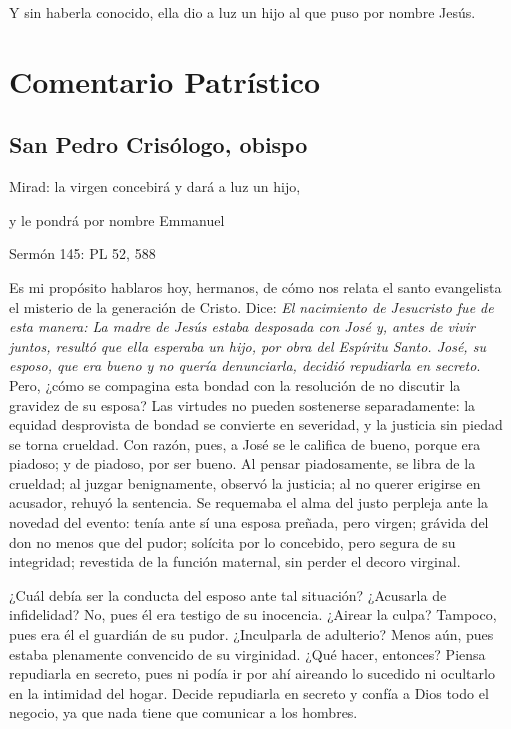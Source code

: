 \begin{body}
\begin{body}
Y sin haberla conocido, ella dio a luz un hijo al que puso por nombre
Jesús.



\section{Comentario Patrístico}

\subsection{San Pedro Crisólogo, obispo}

Mirad: la virgen concebirá y dará a luz un hijo,

y le pondrá por nombre Emmanuel

Sermón 145: PL 52, 588

Es mi propósito hablaros hoy, hermanos, de cómo nos relata el santo evangelista el misterio de la generación de Cristo. Dice: \emph{El nacimiento de Jesucristo fue de esta manera: La madre de Jesús estaba desposada con José y, antes de vivir juntos, resultó que ella esperaba un hijo, por obra del Espíritu Santo. José, su esposo, que era bueno y no quería denunciarla, decidió repudiarla en secreto}. Pero, ¿cómo se compagina esta bondad con la resolución de no discutir la gravidez de su esposa? Las virtudes no pueden sostenerse separadamente: la equidad desprovista de bondad se convierte en severidad, y la justicia sin piedad se torna crueldad. Con razón, pues, a José se le califica de bueno, porque era piadoso; y de piadoso, por ser bueno. Al pensar piadosamente, se libra de la crueldad; al juzgar benignamente, observó la justicia; al no querer erigirse en acusador, rehuyó la sentencia. Se requemaba el alma del justo perpleja ante la novedad del evento: tenía ante sí una esposa preñada, pero virgen; grávida del don no menos que del pudor; solícita por lo concebido, pero segura de su integridad; revestida de la función maternal, sin perder el decoro virginal.

¿Cuál debía ser la conducta del esposo ante tal situación? ¿Acusarla de infidelidad? No, pues él era testigo de su inocencia. ¿Airear la culpa? Tampoco, pues era él el guardián de su pudor. ¿Inculparla de adulterio? Menos aún, pues estaba plenamente convencido de su virginidad. ¿Qué hacer, entonces? Piensa repudiarla en secreto, pues ni podía ir por ahí aireando lo sucedido ni ocultarlo en la intimidad del hogar. Decide repudiarla en secreto y confía a Dios todo el negocio, ya que nada tiene que comunicar a los hombres.


\end{body}
\end{body}
